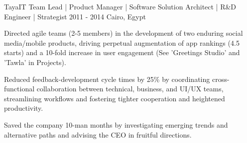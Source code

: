 \begin{cventries}





  \cventry
    {TayaIT} %
    {Team Lead | Product Manager | Software Solution Architect | R\&D Engineer | Strategist}
    {2011 - 2014} %
    {Cairo, Egypt} %
    {
      \begin{cvitems} %
		\item {Directed agile teams (2-5 members) in the development of two enduring social media/mobile products, driving perpetual augmentation of app rankings (4.5 starts) and a 10-fold increase in user engagement (See 'Greetings Studio' and 'Tawla' in Projects).}
		\item {Reduced feedback-development cycle times by 25\% by coordinating cross-functional collaboration between technical, business, and UI/UX teams, streamlining workflows and fostering tighter cooperation and heightened productivity.}
		\item {Saved the company 10-man months by investigating emerging trends and alternative paths and advising the CEO in fruitful directions.}
      \end{cvitems}
    }





\end{cventries}
